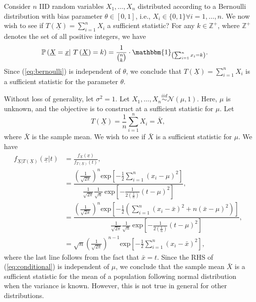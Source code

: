 \documentclass[a4paper,english,12pt]{article}
\begin{document}
\begin{exmp}
	Consider $ n $ IID random variables $ X_1, \dots, X_n $ distributed according to a Bernoulli distribution with bias parameter $ \theta \in \left[0,1\right]$, i.e., $ X_i \in \{0,1\} \forall i=1,\ldots,n $. We now wish to see if $ T\left(\underline{X}\right) = \sum\limits_{i=1}^{n} X_i$ a sufficient statistic? For any $ k\in \mathbb{Z}^{+} $, where $ \mathbb{Z}^{+} $ denotes the set of all positive integers, we have
	\begin{align}
	\mathbb{P}\left(\underline{X} = \underline{x} \vert ~ T\left(\underline{X}\right) = k \right) &= \frac{1}{ \binom{n}{k}} \cdot \mathbbm{1}_{\left( \sum_{i=1}^{n} x_i = k \right)} .\label{eq:bernoulli}
	\end{align}     
	Since (\ref*{eq:bernoulli}) is independent of $ \theta $, we conclude that $ T\left(\underline{X}\right) = \sum\limits_{i=1}^{n} X_i $ is a sufficient statistic for the parameter $ \theta $. 
\end{exmp}
\begin{exmp}
	Without loss of generality, let $ \sigma^{2}=1 $. Let $ X_{1},\ldots,X_{n} \stackrel{iid}{\sim} \mathcal{N}(\mu,1) $. Here, $ \mu $ is unknown, and the objective is to construct at a sufficient statistic for $ \mu $. Let
	\begin{equation}
	T(\underline{X})=\frac{1}{n}\sum\limits_{i=1}^{n}X_{i} = \bar{X}\label{eq:T(X)},
	\end{equation}
	where $ \bar{X} $ is the sample mean. We wish to see if $ \bar{X} $ is a sufficient statistic for $ \mu $. We have
	\begin{align}
		f_{\underline{X}|T(\underline{X})}(\underline{x}|t)&=\frac{f_{\underline{X}}(\underline{x})}{f_{T(\underline{X})}(t)},\nonumber\\
		&=\dfrac{\left(\frac{1}{\sqrt{2\pi}}\right)^{n} \text{exp}\left[-\frac{1}{2}\sum\limits_{i=1}^{n}\left(x_{i}-\mu\right)^{2}\right]}{\frac{1}{\sqrt{2\pi}} \frac{1}{\sqrt{n}}~ \text{exp}\left[-\frac{1}{2\left(\frac{1}{n}\right)} \left(t-\mu\right)^{2}\right]},\nonumber\\
		&=\dfrac{\left(\frac{1}{\sqrt{2\pi}}\right)^{n} \text{exp}\left[-\frac{1}{2}\left(\sum\limits_{i=1}^{n}\left(x_{i}-\bar{x}\right)^{2}+n\left(\bar{x}-\mu\right)^{2}\right)\right]}{\frac{1}{\sqrt{2\pi}} \frac{1}{\sqrt{n}}~ \text{exp}\left[-\frac{1}{2\left(\frac{1}{n}\right)} \left(t-\mu\right)^{2}\right]},\nonumber\\
		&=\sqrt{n} \left(\frac{1}{\sqrt{2\pi}}\right)^{n-1} \text{exp}\left[-\frac{1}{2}\sum\limits_{i=1}^{n}\left(x_{i}-\bar{x}\right)^{2}\right],\label{eq:conditional}
		\end{align}
		where the last line follows from the fact that $ \bar{x}=t $. Since the RHS of (\ref*{eq:conditional}) is independent of $ \mu $, we conclude that the sample mean $ \bar{X} $ is a sufficient statistic for the mean of a population following normal distribution when the variance is known. However, this is not true in general for other distributions.
\end{exmp}
\end{document}
